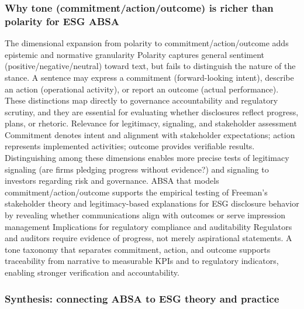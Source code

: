 \subsubsection{Why tone (commitment/action/outcome) is richer than polarity for ESG ABSA}

The dimensional expansion from polarity to commitment/action/outcome adds epistemic and normative granularity
Polarity captures general sentiment (positive/negative/neutral) toward text, but fails to distinguish the nature of the stance. A sentence may express a commitment (forward-looking intent), describe an action (operational activity), or report an outcome (actual performance). These distinctions map directly to governance accountability and regulatory scrutiny, and they are essential for evaluating whether disclosures reflect progress, plans, or rhetoric.
Relevance for legitimacy, signaling, and stakeholder assessment
Commitment denotes intent and alignment with stakeholder expectations; action represents implemented activities; outcome provides verifiable results. Distinguishing among these dimensions enables more precise tests of legitimacy signaling (are firms pledging progress without evidence?) and signaling to investors regarding risk and governance. ABSA that models commitment/action/outcome supports the empirical testing of Freeman’s stakeholder theory and legitimacy-based explanations for ESG disclosure behavior by revealing whether communications align with outcomes or serve impression management \cite{10.3390/jrfm16100429,10.1002/csr.70116,10.1108/sampj-10-2020-0358,10.2139/ssrn.5130854,10.1177/21582440251383232,}
Implications for regulatory compliance and auditability
Regulators and auditors require evidence of progress, not merely aspirational statements. A tone taxonomy that separates commitment, action, and outcome supports traceability from narrative to measurable KPIs and to regulatory indicators, enabling stronger verification and accountability.
\subsubsection{Synthesis: connecting ABSA to ESG theory and practice}

